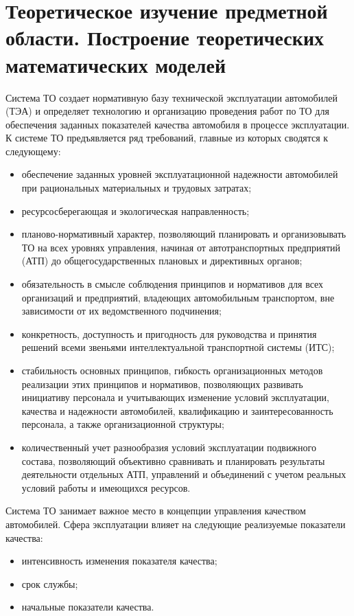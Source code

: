 \documentclass[../nirs.tex]{subfiles}
\begin{document}
\section{Теоретическое изучение предметной области. Построение теоретических
математических моделей}

Система ТО создает нормативную базу технической эксплуатации автомобилей
(ТЭА) и определяет технологию и организацию проведения работ по ТО для
обеспечения заданных показателей качества автомобиля в процессе эксплуатации. К
системе ТО предъявляется ряд требований, главные из которых сводятся к
следующему:
\begin{itemize}
    \item обеспечение заданных уровней эксплуатационной надежности автомобилей
        при рациональных материальных и трудовых затратах;
    \item ресурсосберегающая и экологическая направленность;
    \item планово-нормативный характер, позволяющий планировать и организовывать
        ТО на всех уровнях управления, начиная от автотранспортных
        предприятий (АТП) до общегосударственных плановых и директивных органов;
    \item обязательность в смысле соблюдения принципов и нормативов для всех
        организаций и предприятий, владеющих автомобильным транспортом, вне
        зависимости от их ведомственного подчинения;
    \item конкретность, доступность и пригодность для руководства и принятия
        решений всеми звеньями интеллектуальной транспортной системы (ИТС);
    \item стабильность основных принципов, гибкость организационных методов
        реализации этих принципов и нормативов, позволяющих развивать инициативу
        персонала и учитывающих изменение условий эксплуатации, качества и
        надежности автомобилей, квалификацию и заинтересованность персонала, а
        также организационной структуры;
    \item количественный учет разнообразия условий эксплуатации подвижного
        состава, позволяющий объективно сравнивать и планировать результаты
        деятельности отдельных АТП, управлений и объединений с учетом реальных
        условий работы и имеющихся ресурсов.
\end{itemize}

Система ТО занимает важное место в концепции управления качеством
автомобилей. Сфера эксплуатации влияет на следующие реализуемые показатели
качества:
\begin{itemize}
    \item интенсивность изменения показателя качества;
    \item срок службы;
    \item начальные показатели качества.
\end{itemize}
\end{document}
